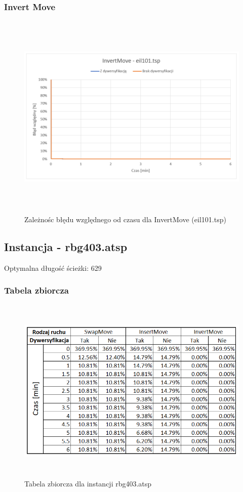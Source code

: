 \documentclass[a4paper,11pt]{article}
\begin{document}
\subsubsection{Invert Move}
\begin{figure}[H]
\centering
\includegraphics[height=10cm]{InvertMove101.PNG}
\caption{Zależnośc błędu względnego od czasu dla InvertMove (eil101.tsp)}
\end{figure}

\subsection{Instancja - rbg403.atsp}

Optymalna długość ścieżki: 629

\subsubsection{Tabela zbiorcza}

\begin{figure}[H]
\centering
\includegraphics[height=9cm]{101.PNG}
\caption{Tabela zbiorcza dla instancji rbg403.atsp}
\end{figure}
\end{document}
